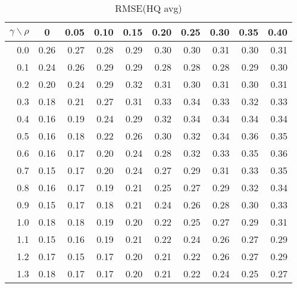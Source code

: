\documentclass[12pt]{article}
\begin{document}
\begin{table}[!tbp]
\caption{RMSE(HQ avg)}
 \begin{center}
 \begin{tabular}{r|rrrrrrrrr}\hline\hline
\multicolumn{1}{c|}{$\gamma\backslash\rho$}&\multicolumn{1}{c}{0}&\multicolumn{1}{c}{0.05}&\multicolumn{1}{c}{0.10}&\multicolumn{1}{c}{0.15}&\multicolumn{1}{c}{0.20}&\multicolumn{1}{c}{0.25}&\multicolumn{1}{c}{0.30}&\multicolumn{1}{c}{0.35}&\multicolumn{1}{c}{0.40}\tabularnewline
\hline

0.0&0.26&0.27&0.28&0.29&0.30&0.30&0.31&0.30&0.31\tabularnewline
0.1&0.24&0.26&0.29&0.29&0.28&0.28&0.28&0.29&0.30\tabularnewline
0.2&0.20&0.24&0.29&0.32&0.31&0.30&0.31&0.30&0.31\tabularnewline
0.3&0.18&0.21&0.27&0.31&0.33&0.34&0.33&0.32&0.33\tabularnewline
0.4&0.16&0.19&0.24&0.29&0.32&0.34&0.34&0.34&0.34\tabularnewline
0.5&0.16&0.18&0.22&0.26&0.30&0.32&0.34&0.36&0.35\tabularnewline
0.6&0.16&0.17&0.20&0.24&0.28&0.32&0.33&0.35&0.36\tabularnewline
0.7&0.15&0.17&0.20&0.24&0.27&0.29&0.31&0.33&0.35\tabularnewline
0.8&0.16&0.17&0.19&0.21&0.25&0.27&0.29&0.32&0.34\tabularnewline
0.9&0.15&0.17&0.18&0.21&0.24&0.26&0.28&0.30&0.33\tabularnewline
1.0&0.18&0.18&0.19&0.20&0.22&0.25&0.27&0.29&0.31\tabularnewline
1.1&0.15&0.16&0.19&0.21&0.22&0.24&0.26&0.27&0.29\tabularnewline
1.2&0.17&0.15&0.17&0.20&0.21&0.22&0.26&0.27&0.29\tabularnewline
1.3&0.18&0.17&0.17&0.20&0.21&0.22&0.24&0.25&0.27\tabularnewline
\hline
\end{tabular}

\end{center}

\end{table}

%
\end{document}
